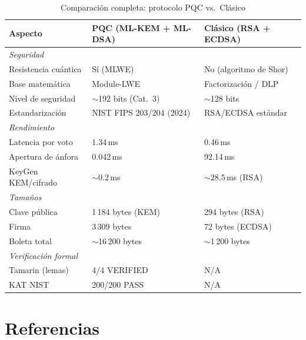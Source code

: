 \documentclass[12pt,a4paper,twoside,openright]{book}
\theoremstyle{plain}
\theoremstyle{definition}
\theoremstyle{remark}
\begin{document}
\begin{table}[H]
\centering
\caption{Comparaci\'on completa: protocolo PQC vs.\ Cl\'asico}
\label{tab:comp_completa}
\begin{tabular}{lll}
\toprule
\textbf{Aspecto} & \textbf{PQC (ML-KEM + ML-DSA)} & \textbf{Cl\'asico (RSA + ECDSA)} \\
\midrule
\multicolumn{3}{l}{\textit{Seguridad}} \\
Resistencia cu\'antica & S\'i (MLWE) & No (algoritmo de Shor) \\
Base matem\'atica & Module-LWE & Factorizaci\'on / DLP \\
Nivel de seguridad & $\sim$192 bits (Cat.\ 3) & $\sim$128 bits \\
Estandarizaci\'on & NIST FIPS 203/204 (2024) & RSA/ECDSA est\'andar \\
\midrule
\multicolumn{3}{l}{\textit{Rendimiento}} \\
Latencia por voto & 1.34\,ms & 0.46\,ms \\
Apertura de \'anfora & 0.042\,ms & 92.14\,ms \\
KeyGen KEM/cifrado & $\sim$0.2\,ms & $\sim$28.5\,ms (RSA) \\
\midrule
\multicolumn{3}{l}{\textit{Tama\~nos}} \\
Clave p\'ublica & 1\,184 bytes (KEM) & 294 bytes (RSA) \\
Firma & 3\,309 bytes & 72 bytes (ECDSA) \\
Boleta total & $\sim$16\,200 bytes & $\sim$1\,200 bytes \\
\midrule
\multicolumn{3}{l}{\textit{Verificaci\'on formal}} \\
Tamarin (lemas) & 4/4 VERIFIED & N/A \\
KAT NIST & 200/200 PASS & N/A \\
\bottomrule
\end{tabular}
\end{table}

\backmatter

\chapter*{Referencias}
\end{document}
